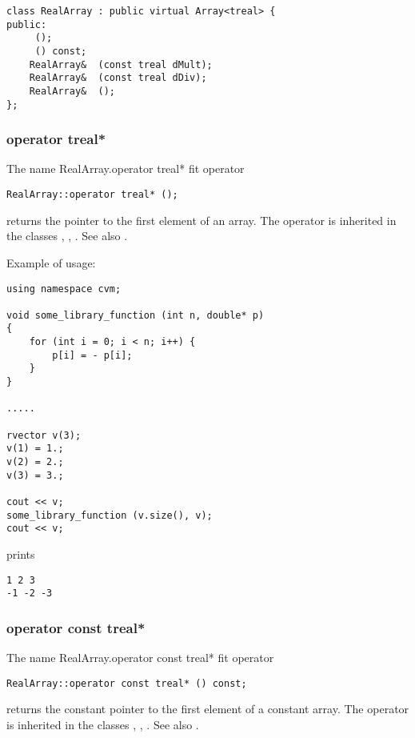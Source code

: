 \bigskip
\noindent
\verb"class RealArray : public virtual Array<treal> {"\\
\verb"public:"\\
\verb"    "\verb" ();"\\
\verb"    "\verb" () const;"\\
\verb"    RealArray& "\verb" (const treal dMult);"\\
\verb"    RealArray& "\verb" (const treal dDiv);"\\
\verb"    RealArray& "\verb" ();"\\
\verb"};"
\newpage



\subsubsection{operator treal*}
The%
\pdfdest name {RealArray.operator treal*} fit
operator
\begin{verbatim}
RealArray::operator treal* ();
\end{verbatim}
returns the pointer to the first element of an array.
The operator is inherited in the classes
,
,
.
See also .

Example of usage:
\begin{verbatim}
using namespace cvm;

void some_library_function (int n, double* p)
{
    for (int i = 0; i < n; i++) {
        p[i] = - p[i];
    }
}

.....

rvector v(3);
v(1) = 1.;
v(2) = 2.;
v(3) = 3.;

cout << v;
some_library_function (v.size(), v);
cout << v;
\end{verbatim}
prints
\begin{verbatim}
1 2 3
-1 -2 -3
\end{verbatim}
\newpage





\subsubsection{operator const treal*}
The%
\pdfdest name {RealArray.operator const treal*} fit
operator
\begin{verbatim}
RealArray::operator const treal* () const;
\end{verbatim}
returns the constant pointer to the first
element of a constant array.
The operator is inherited in the classes
,
,
.
See also .


